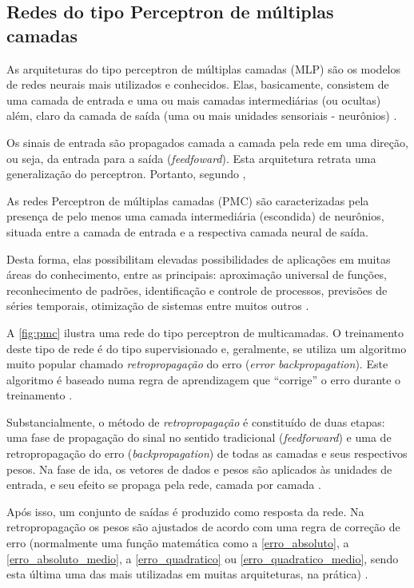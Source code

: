 \subsection{Redes do tipo Perceptron de múltiplas camadas}
As arquiteturas do tipo perceptron de múltiplas camadas (MLP) são os modelos de redes neurais mais utilizados e conhecidos. Elas, basicamente, consistem de uma camada de entrada e uma ou mais camadas intermediárias (ou ocultas) além, claro da camada de saída (uma ou mais unidades sensoriais - neurônios) \cite{haykin_redes_2001}.

Os sinais de entrada são propagados camada a camada pela rede em uma direção, ou seja, da entrada para a saída (\textit{feedfoward}). Esta arquitetura retrata uma generalização do perceptron. Portanto, segundo , 
\begin{citacao}
	As redes Perceptron de múltiplas camadas (PMC) são caracterizadas pela presença de pelo menos uma camada intermediária (escondida) de neurônios, situada entre a camada de entrada e a respectiva camada neural de saída.
\end{citacao}

Desta forma, elas possibilitam elevadas possibilidades de aplicações em muitas áreas do conhecimento, entre as principais: aproximação universal de funções, reconhecimento de padrões, identificação e controle de processos, previsões de séries temporais, otimização de sistemas entre muitos outros \cite{haykin_redes_2001}.

A \autoref{fig:pmc} ilustra uma rede do tipo perceptron de multicamadas. O treinamento deste tipo de rede é do tipo supervisionado e, geralmente, se utiliza um algoritmo muito popular chamado \textit{retropropagação} do erro (\textit{error backpropagation}). Este algoritmo é baseado numa regra de aprendizagem que “corrige” o erro durante o treinamento \cite{haykin_redes_2001}.

Substancialmente, o método de \textit{retropropagação} é constituído de duas etapas: uma fase de propagação do sinal no sentido tradicional (\textit{feedforward}) e uma de retropropagação do erro (\textit{backpropagation}) de todas as camadas e seus respectivos pesos. Na fase de ida, os vetores de dados e pesos são aplicados às unidades de entrada, e seu efeito se propaga pela rede, camada por camada \cite{hagan_neural_1996} \cite{haykin_redes_2001}.

Após isso, um conjunto de saídas é produzido como resposta da rede. Na retropropagação os pesos são ajustados de acordo com uma regra de correção de erro (normalmente uma função matemática como a \autoref{erro_absoluto}, a \autoref{erro_absoluto_medio}, a \autoref{erro_quadratico} ou \autoref{erro_quadratico_medio}, sendo esta última uma das mais utilizadas em muitas arquiteturas, na prática) \cite{haykin_redes_2001} \cite{hagan_neural_1996} \cite{yeung_neural_2004}.

